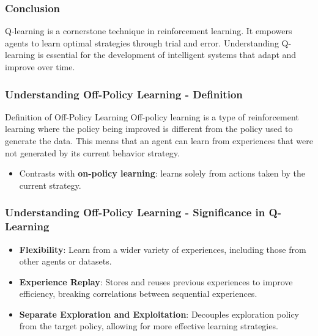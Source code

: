 \documentclass{beamer}
\begin{document}
\begin{frame}[fragile]
    \frametitle{Conclusion}
    Q-learning is a cornerstone technique in reinforcement learning.
    It empowers agents to learn optimal strategies through trial and error.
    Understanding Q-learning is essential for the development of intelligent systems that adapt and improve over time.
\end{frame}

\begin{frame}[fragile]
    \frametitle{Understanding Off-Policy Learning - Definition}
    \begin{block}{Definition of Off-Policy Learning}
        Off-policy learning is a type of reinforcement learning where the policy being improved is different from the policy used to generate the data. This means that an agent can learn from experiences that were not generated by its current behavior strategy.
    \end{block}
    \begin{itemize}
        \item Contrasts with \textbf{on-policy learning}: learns solely from actions taken by the current strategy.
    \end{itemize}
\end{frame}

\begin{frame}[fragile]
    \frametitle{Understanding Off-Policy Learning - Significance in Q-Learning}
    \begin{itemize}
        \item \textbf{Flexibility}: Learn from a wider variety of experiences, including those from other agents or datasets.
        \item \textbf{Experience Replay}: Stores and reuses previous experiences to improve efficiency, breaking correlations between sequential experiences.
        \item \textbf{Separate Exploration and Exploitation}: Decouples exploration policy from the target policy, allowing for more effective learning strategies.
    \end{itemize}
\end{frame}
\end{document}
